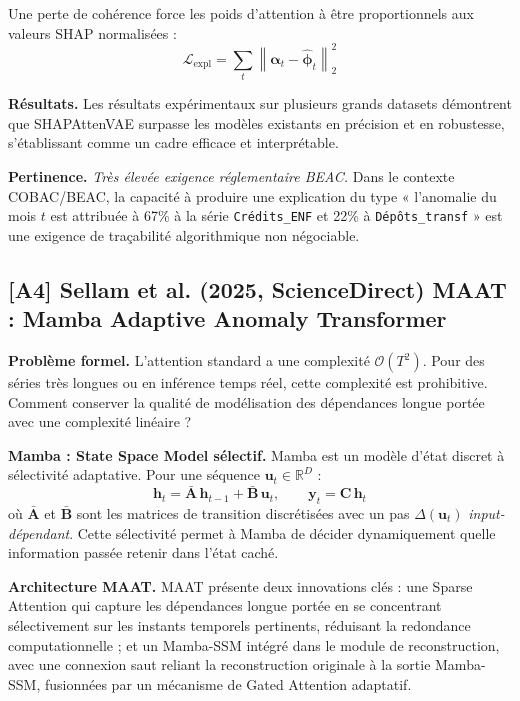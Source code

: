 \documentclass[12pt,a4paper]{article}
\begin{document}
Une perte de cohérence force les poids d'attention à être proportionnels aux valeurs SHAP normalisées :
$$\mathcal{L}_{\mathrm{expl}} = \sum_t\left\|\boldsymbol{\alpha}_t - \hat{\boldsymbol{\phi}}_t\right\|_2^2$$

\textbf{Résultats.} Les résultats expérimentaux sur plusieurs grands datasets démontrent que SHAPAttenVAE surpasse les modèles existants en précision et en robustesse, s'établissant comme un cadre efficace et interprétable.

\textbf{Pertinence.} \textit{Très élevée  exigence réglementaire BEAC.} Dans le contexte COBAC/BEAC, la capacité à produire une explication du type « l'anomalie du mois $t$ est attribuée à 67\% à la série \texttt{Crédits\_ENF} et 22\% à \texttt{Dépôts\_transf} » est une exigence de traçabilité algorithmique non négociable.

\subsection{[A4] Sellam et al. (2025, ScienceDirect)  MAAT : Mamba Adaptive Anomaly Transformer}

\textbf{Problème formel.} L'attention standard a une complexité $\mathcal{O}(T^2)$. Pour des séries très longues ou en inférence temps réel, cette complexité est prohibitive. Comment conserver la qualité de modélisation des dépendances longue portée avec une complexité linéaire ?

\textbf{Mamba : State Space Model sélectif.} Mamba est un modèle d'état discret à sélectivité adaptative. Pour une séquence $\mathbf{u}_t \in \mathbb{R}^D$ :
$$\mathbf{h}_t = \bar{\mathbf{A}}\,\mathbf{h}_{t-1} + \bar{\mathbf{B}}\,\mathbf{u}_t, \qquad \mathbf{y}_t = \mathbf{C}\,\mathbf{h}_t$$
où $\bar{\mathbf{A}}$ et $\bar{\mathbf{B}}$ sont les matrices de transition discrétisées avec un pas $\Delta(\mathbf{u}_t)$ \textit{input-dépendant}. Cette sélectivité permet à Mamba de décider dynamiquement quelle information passée retenir dans l'état caché.

\textbf{Architecture MAAT.} MAAT présente deux innovations clés : une Sparse Attention qui capture les dépendances longue portée en se concentrant sélectivement sur les instants temporels pertinents, réduisant la redondance computationnelle ; et un Mamba-SSM intégré dans le module de reconstruction, avec une connexion saut reliant la reconstruction originale à la sortie Mamba-SSM, fusionnées par un mécanisme de Gated Attention adaptatif.
\end{document}
